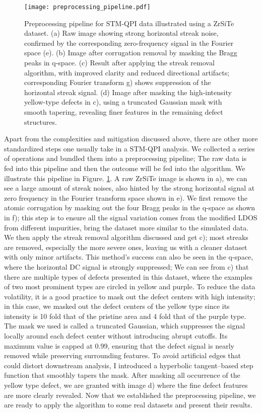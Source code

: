 \begin{figure}
	\texttt{[image: preprocessing\_pipeline.pdf]} 
	\centering
	\caption{Preprocessing pipeline for STM-QPI data illustrated using a ZrSiTe dataset. (a) Raw image showing strong horizontal streak noise, confirmed by the corresponding zero-frequency signal in the Fourier space (e). (b) Image after corrugation removal by masking the Bragg peaks in q-space. (c) Result after applying the streak removal algorithm, with improved clarity and reduced directional artifacts; corresponding Fourier transform g) shows suppression of the horizontal streak signal. (d) Image after masking the high-intensity yellow-type defects in c), using a truncated Gaussian mask with smooth tapering, revealing finer features in the remaining defect structures.}
	\label{fig:pipeline}
\end{figure}

Apart from the complexities and mitigation discussed above, there are other more standardized steps one usually take in a STM-QPI analysis. We collected a series of operations and bundled them into a preprocessing pipeline; The raw data is fed into this pipeline and then the outcome will be fed into the algorithm. We illustrate this pipeline in Figure. \ref{fig:pipeline}. A raw ZrSiTe image is shown in a), we can see a large amount of streak noises, also hinted by the strong horizontal signal at zero frequency in the Fourier transform space shown in e). We first remove the atomic corrugation by masking out the four Bragg peaks in the q-space as shown in f); this step is to ensure all the signal variation comes from the modified \ac{LDOS} from different impurities, bring the dataset more similar to the simulated data. We then apply the streak removal algorithm discussed and get c); most streaks are removed, especially the more severe ones, leaving us with a cleaner dataset with only minor artifacts. This method's success can also be seen in the q-space, where the horizontal DC signal is strongly suppressed; We can see from c) that there are multiple types of defects presented in this dataset, where the examples of two most prominent types are circled in yellow and purple. To reduce the data volatility, it is a good practice to mask out the defect centers with high intensity; in this case, we masked out the defect centers of the yellow type since its intensity is 10 fold that of the pristine area and 4 fold that of the purple type. The mask we used is called a truncated Gaussian, which suppresses the signal locally around each defect center without introducing abrupt cutoffs. Its maximum value is capped at 0.99, ensuring that the defect signal is nearly removed while preserving surrounding features. To avoid artificial edges that could distort downstream analysis, I introduced a hyperbolic tangent–based step function that smoothly tapers the mask. After masking all occurrence of the yellow type defect, we are granted with image d) where the fine defect features are more clearly revealed. Now that we established the preprocessing pipeline, we are ready to apply the algorithm to some real datasets and present their results. 

